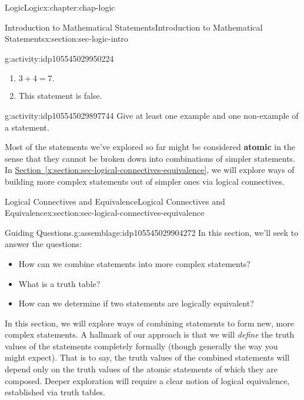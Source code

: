\documentclass[oneside,10pt,]{book}
\newcommand{\xreffont}{\relax}
\newcommand{\terminology}[1]{\textbf{#1}}
\begin{document}
\begin{chapterptx}{Logic}{}{Logic}{}{}{x:chapter:chap-logic}
\begin{sectionptx}{Introduction to Mathematical Statements}{}{Introduction to Mathematical Statements}{}{}{x:section:sec-logic-intro}
\begin{activity}{}{g:activity:idp105545029950224}
\begin{enumerate}
\item{}\(\displaystyle 3+4=7.\)%
\item{}This statement is false.%
\end{enumerate}
\end{activity}%
\begin{activity}{}{g:activity:idp105545029897744}%
Give at least one example and one non-example of a statement.%
\end{activity}%
Most of the statements we've explored so far might be considered \terminology{atomic} in the sense that they cannot be broken down into combinations of simpler statements. In \hyperref[x:section:sec-logical-connectives-equivalence]{Section~{\xreffont\ref{x:section:sec-logical-connectives-equivalence}}}, we will explore ways of building more complex statements out of simpler ones via logical connectives.%
\end{sectionptx}
%
%
\typeout{************************************************}
\typeout{************************************************}
%
\begin{sectionptx}{Logical Connectives and Equivalence}{}{Logical Connectives and Equivalence}{}{}{x:section:sec-logical-connectives-equivalence}
\begin{assemblage}{Guiding Questions.}{g:assemblage:idp105545029904272}%
In this section, we'll seek to answer the questions: %
\begin{itemize}[label=\textbullet]
\item{}How can we combine statements into more complex statements?%
\item{}What is a truth table?%
\item{}How can we determine if two statements are logically equivalent?%
\end{itemize}
%
\end{assemblage}
\begin{introduction}{}%
In this section, we will explore ways of combining statements to form new, more complex statements. A hallmark of our approach is that we will \emph{define} the truth values of the statements completely formally (though generally the way you might expect). That is to say, the truth values of the combined statements will depend only on the truth values of the atomic statements of which they are composed. Deeper exploration will require a clear notion of logical equivalence, established via truth tables.%
\end{introduction}%
%
%
\typeout{************************************************}

\end{sectionptx}
\end{chapterptx}
\end{document}
